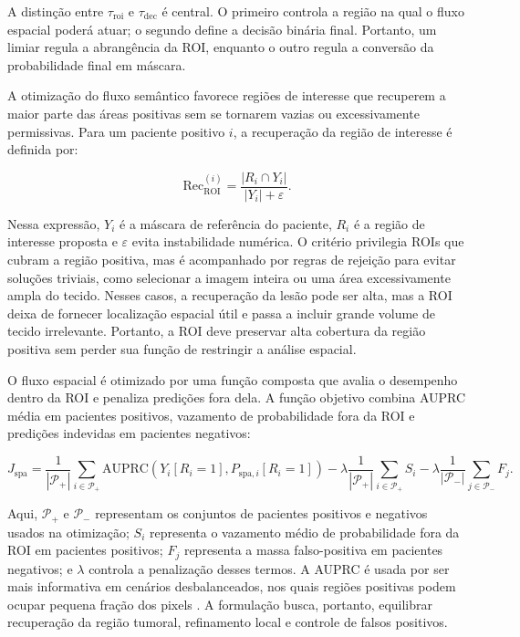 A distinção entre $\tau_{\mathrm{roi}}$ e $\tau_{\mathrm{dec}}$ é central. O
primeiro controla a região na qual o fluxo espacial poderá atuar; o segundo
define a decisão binária final. Portanto, um limiar regula a abrangência da ROI,
enquanto o outro regula a conversão da probabilidade final em máscara.

A otimização do fluxo semântico favorece regiões de interesse que recuperem a
maior parte das áreas positivas sem se tornarem vazias ou excessivamente
permissivas. Para um paciente positivo $i$, a recuperação da região de interesse
é definida por:

\begin{equation}
    \mathrm{Rec}_{\mathrm{ROI}}^{(i)} =
    \frac{|R_i \cap Y_i|}{|Y_i|+\varepsilon}.
    \label{eq:roi_recall}
\end{equation}

Nessa expressão, $Y_i$ é a máscara de referência do paciente, $R_i$ é a região
de interesse proposta e $\varepsilon$ evita instabilidade numérica. O critério
privilegia ROIs que cubram a região positiva, mas é acompanhado por regras de
rejeição para evitar soluções triviais, como selecionar a imagem inteira ou uma
área excessivamente ampla do tecido. Nesses casos, a recuperação da lesão pode
ser alta, mas a ROI deixa de fornecer localização espacial útil e passa a
incluir grande volume de tecido irrelevante. Portanto, a ROI deve preservar alta
cobertura da região positiva sem perder sua função de restringir a análise
espacial.

O fluxo espacial é otimizado por uma função composta que avalia o desempenho
dentro da ROI e penaliza predições fora dela. A função objetivo combina AUPRC
média em pacientes positivos, vazamento de probabilidade fora da ROI e predições
indevidas em pacientes negativos:

\begin{equation}
    J_{\mathrm{spa}} =
    \frac{1}{|\mathcal{P}_+|}
    \sum_{i\in\mathcal{P}_+}
    \mathrm{AUPRC}\left(Y_i[R_i=1], P_{\mathrm{spa},i}[R_i=1]\right)
    -
    \lambda\frac{1}{|\mathcal{P}_+|}\sum_{i\in\mathcal{P}_+}S_i
    -
    \lambda\frac{1}{|\mathcal{P}_-|}\sum_{j\in\mathcal{P}_-}F_j .
    \label{eq:spatial_objective}
\end{equation}

Aqui, $\mathcal{P}_+$ e $\mathcal{P}_-$ representam os conjuntos de pacientes
positivos e negativos usados na otimização; $S_i$ representa o vazamento médio de
probabilidade fora da ROI em pacientes positivos; $F_j$ representa a massa
falso-positiva em pacientes negativos; e $\lambda$ controla a penalização desses
termos. A AUPRC é usada por ser mais informativa em cenários desbalanceados, nos
quais regiões positivas podem ocupar pequena fração dos pixels
\cite{saito2015precision}. A formulação busca, portanto, equilibrar recuperação
da região tumoral, refinamento local e controle de falsos positivos.

